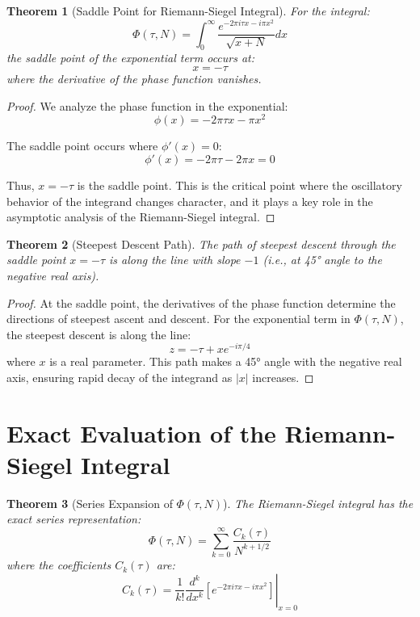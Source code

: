 \documentclass{article}
\newtheorem{theorem}{Theorem}
\begin{document}
\begin{theorem}[Saddle Point for Riemann-Siegel Integral]
For the integral:
\[
\Phi(\tau, N) = \int_0^{\infty}\frac{e^{-2\pi i\tau x - i\pi x^2}}{\sqrt{x + N}}dx
\]
the saddle point of the exponential term occurs at:
\[
x = -\tau
\]
where the derivative of the phase function vanishes.
\end{theorem}

\begin{proof}
We analyze the phase function in the exponential:
\[
\phi(x) = -2\pi \tau x - \pi x^2
\]

The saddle point occurs where $\phi'(x) = 0$:
\[
\phi'(x) = -2\pi \tau - 2\pi x = 0
\]

Thus, $x = -\tau$ is the saddle point. This is the critical point where the oscillatory behavior of the integrand changes character, and it plays a key role in the asymptotic analysis of the Riemann-Siegel integral.
\end{proof}

\begin{theorem}[Steepest Descent Path]
The path of steepest descent through the saddle point $x = -\tau$ is along the line with slope $-1$ (i.e., at 45° angle to the negative real axis).
\end{theorem}

\begin{proof}
At the saddle point, the derivatives of the phase function determine the directions of steepest ascent and descent. For the exponential term in $\Phi(\tau, N)$, the steepest descent is along the line:
\[
z = -\tau + x e^{-i\pi/4}
\]
where $x$ is a real parameter. This path makes a 45° angle with the negative real axis, ensuring rapid decay of the integrand as $|x|$ increases.
\end{proof}

\section{Exact Evaluation of the Riemann-Siegel Integral}

\begin{theorem}[Series Expansion of $\Phi(\tau, N)$]
The Riemann-Siegel integral has the exact series representation:
\[
\Phi(\tau, N) = \sum_{k=0}^{\infty} \frac{C_k(\tau)}{N^{k+1/2}}
\]
where the coefficients $C_k(\tau)$ are:
\[
C_k(\tau) = \frac{1}{k!}\left.\frac{d^k}{dx^k}\left[e^{-2\pi i\tau x - i\pi x^2}\right]\right|_{x=0}
\]
\end{theorem}
\end{document}
